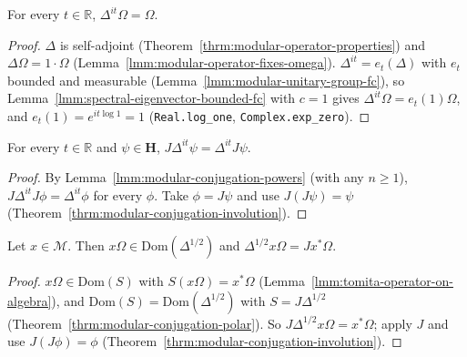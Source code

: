 \begin{lemma}[$\Delta^{it}\Omega = \Omega$]
    \label{lmm:modular-unitary-group-fixes-omega}
    \leanok
    For every $t \in \mathbb{R}$, $\Delta^{it}\Omega = \Omega$.
\end{lemma}
\begin{proof}
    \leanok
    $\Delta$ is self-adjoint (Theorem~\ref{thrm:modular-operator-properties}) and $\Delta\Omega = 1 \cdot \Omega$ (Lemma~\ref{lmm:modular-operator-fixes-omega}). $\Delta^{it} = e_t(\Delta)$ with $e_t$ bounded and measurable (Lemma~\ref{lmm:modular-unitary-group-fc}), so Lemma~\ref{lmm:spectral-eigenvector-bounded-fc} with $c = 1$ gives $\Delta^{it}\Omega = e_t(1)\Omega$, and $e_t(1) = e^{it\log 1} = 1$ (\texttt{Real.log\_one}, \texttt{Complex.exp\_zero}).
\end{proof}

\begin{lemma}
    \label{lmm:modular-conjugation-commutes-unitary-group}
    \leanok
    For every $t \in \mathbb{R}$ and $\psi \in \mathbf{H}$, $J\Delta^{it}\psi = \Delta^{it}J\psi$.
\end{lemma}
\begin{proof}
    \leanok
    By Lemma~\ref{lmm:modular-conjugation-powers} (with any $n \ge 1$), $J\Delta^{it}J\phi = \Delta^{it}\phi$ for every $\phi$. Take $\phi = J\psi$ and use $J(J\psi) = \psi$ (Theorem~\ref{thrm:modular-conjugation-involution}).
\end{proof}

\begin{lemma}[$\Delta^{1/2}x\Omega = Jx^*\Omega$]
    \label{lmm:modular-sqrt-on-algebra}
    \leanok
    Let $x \in \mathcal{M}$. Then $x\Omega \in \text{Dom}(\Delta^{1/2})$ and $\Delta^{1/2}x\Omega = Jx^*\Omega$.
\end{lemma}
\begin{proof}
    \leanok
    $x\Omega \in \text{Dom}(S)$ with $S(x\Omega) = x^*\Omega$ (Lemma~\ref{lmm:tomita-operator-on-algebra}), and $\text{Dom}(S) = \text{Dom}(\Delta^{1/2})$ with $S = J\Delta^{1/2}$ (Theorem~\ref{thrm:modular-conjugation-polar}). So $J\Delta^{1/2}x\Omega = x^*\Omega$; apply $J$ and use $J(J\phi) = \phi$ (Theorem~\ref{thrm:modular-conjugation-involution}).
\end{proof}

